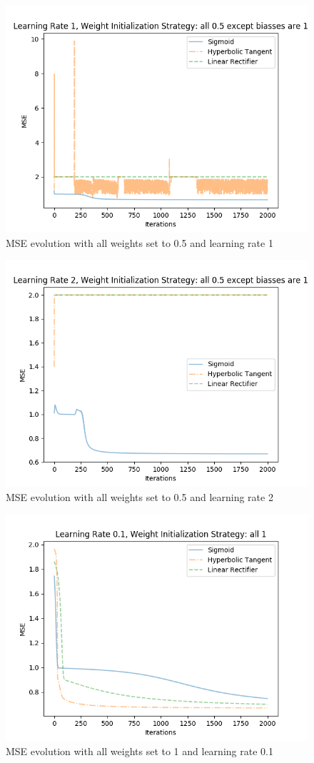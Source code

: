 \documentclass{article}
\begin{document}
\begin{figure}[H]
\centering
\includegraphics[width=0.9\linewidth]{img/mse_all05exceptbiassesare1_1.png}
\caption{MSE evolution with all weights set to 0.5 and learning rate 1}
\label{fig:mse051}
\end{figure}
\begin{figure}[H]
\centering
\includegraphics[width=0.9\linewidth]{img/mse_all05exceptbiassesare1_2.png}
\caption{MSE evolution with all weights set to 0.5 and learning rate 2}
\label{fig:mse052}
\end{figure}
\begin{figure}[H]
\centering
\includegraphics[width=0.9\linewidth]{img/mse_all1_01.png}
\caption{MSE evolution with all weights set to 1 and learning rate 0.1}
\label{fig:mse101}
\end{figure}
\end{document}

